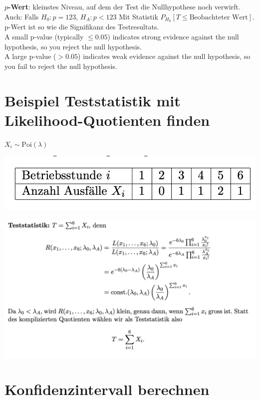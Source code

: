 \textbf{$p$-Wert}: kleinstes Niveau, auf dem der Test die Nullhypothese noch verwirft.\\

Auch: Falls $H_0: p = 123$, $H_A: p < 123$ Mit Statistik $P_{H_0}[T\leq \text{Beobachteter Wert}]$. p-Wert ist so wie die Signifikanz des Testresultats.\\

A small p-value (typically $\leq 0.05$) indicates strong evidence against the null hypothesis, so you reject the null hypothesis.\\

A large p-value ($> 0.05$) indicates weak evidence against the null hypothesis, so you fail to reject the null hypothesis.

\section{Beispiel Teststatistik mit Likelihood-Quotienten finden}

$X_i \sim \text{Poi}(\lambda)$ 

\includegraphics[width=.4\textwidth]{images/likelihood1}

\includegraphics[width=\textwidth]{images/likelihood2}

\section{Konfidenzintervall berechnen}


